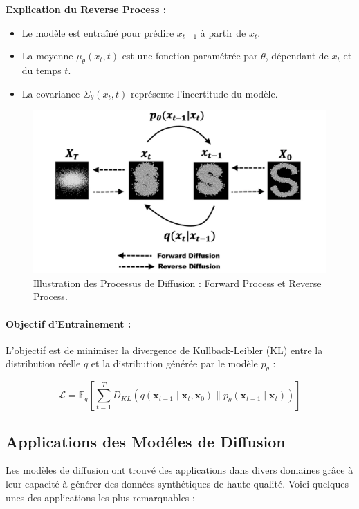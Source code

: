 \textbf{Explication du Reverse Process :}

\begin{itemize}
	\item Le modèle est entraîné pour prédire \( x_{t-1} \) à partir de \( x_t \).
	\item La moyenne \( \mu_\theta(x_t, t) \) est une fonction paramétrée par \( \theta
	      \), dépendant de \( x_t \) et du temps \( t \).
	\item La covariance \( \Sigma_\theta(x_t, t) \) représente l'incertitude du modèle.
\end{itemize}

\begin{figure}[hbt!]
	\centering
	\includegraphics[width=12cm]{images_pfe/diffusion_process.png}
	\caption{Illustration des Processus de Diffusion : Forward Process et Reverse Process.}
	\label{fig:markov}
\end{figure}
\FloatBarrier

\paragraph{Objectif d'Entraînement :}
L'objectif est de minimiser la divergence de Kullback-Leibler (KL) entre la
distribution réelle \( q \) et la distribution générée par le modèle \(
p_\theta \) :

\begin{equation}
    \mathcal{L} = \mathbb{E}_q \left[ \sum_{t=1}^T D_{KL}(q(\mathbf{x}_{t-1} \mid \mathbf{x}_t, \mathbf{x}_0) \| p_\theta(\mathbf{x}_{t-1} \mid \mathbf{x}_t)) \right]
\end{equation}

\subsection{Applications des Modéles de Diffusion}
Les modèles de diffusion ont trouvé des applications dans divers domaines grâce
à leur capacité à générer des données synthétiques de haute qualité. Voici
quelques-unes des applications les plus remarquables :

